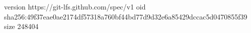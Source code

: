 version https://git-lfs.github.com/spec/v1
oid sha256:49f37eae0ae2174df57318a760bf44bd77d9d32e6a85429dccac5d0470855f39
size 248404
